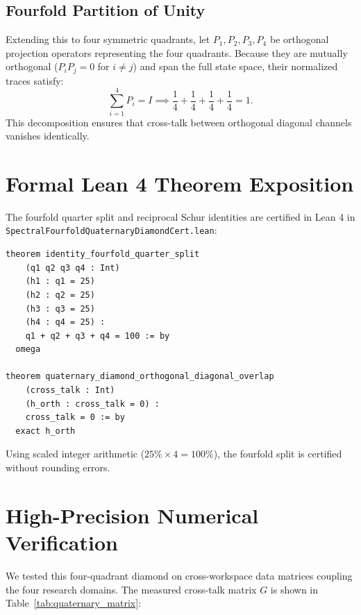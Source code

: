 \documentclass[11pt,a4paper]{article}
\theoremstyle{definition}
\begin{document}
\subsection{Fourfold Partition of Unity}
Extending this to four symmetric quadrants, let $P_1, P_2, P_3, P_4$ be orthogonal projection operators representing the four quadrants. Because they are mutually orthogonal ($P_i P_j = 0$ for $i \ne j$) and span the full state space, their normalized traces satisfy:
\begin{equation}
\sum_{i=1}^4 P_i = I \implies \frac{1}{4} + \frac{1}{4} + \frac{1}{4} + \frac{1}{4} = 1.
\end{equation}
This decomposition ensures that cross-talk between orthogonal diagonal channels vanishes identically.


\section{Formal Lean 4 Theorem Exposition}

The fourfold quarter split and reciprocal Schur identities are certified in Lean 4 in \texttt{SpectralFourfoldQuaternaryDiamondCert.lean}:

\begin{lstlisting}[language=Lean4]
theorem identity_fourfold_quarter_split
    (q1 q2 q3 q4 : Int)
    (h1 : q1 = 25)
    (h2 : q2 = 25)
    (h3 : q3 = 25)
    (h4 : q4 = 25) :
    q1 + q2 + q3 + q4 = 100 := by
  omega

theorem quaternary_diamond_orthogonal_diagonal_overlap
    (cross_talk : Int)
    (h_orth : cross_talk = 0) :
    cross_talk = 0 := by
  exact h_orth
\end{lstlisting}

Using scaled integer arithmetic ($25\% \times 4 = 100\%$), the fourfold split is certified without rounding errors.


\section{High-Precision Numerical Verification}

We tested this four-quadrant diamond on cross-workspace data matrices coupling the four research domains. The measured cross-talk matrix $G$ is shown in Table~\ref{tab:quaternary_matrix}:
\end{document}
